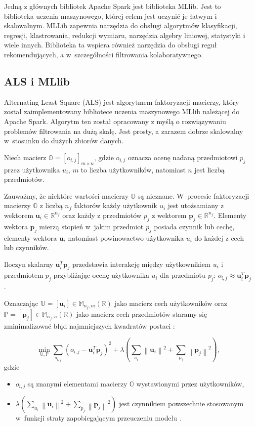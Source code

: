 \documentclass[12pt,a4paper]{report}
\newcommand{\setR}{\mathbb{R}}
\newcommand{\norm}[2][]{\left\| {#2} \right\|_{#1}}
\begin{document}
Jedną z głównych bibliotek Apache Spark jest biblioteka MLlib. Jest to biblioteka uczenia maszynowego, której celem jest uczynić je łatwym i skalowalnym. MLLib zapewnia narzędzia do obsługi algorytmów klasyfikacji, regresji, klastrowania, redukcji wymiaru, narzędzia algebry liniowej, statystyki i wiele innych. Biblioteka ta wspiera również narzędzia do obsługi reguł rekomendujących, a w~szczególności filtrowania kolaboratywnego.

\subsection{ALS i MLlib}
Alternating Least Square (ALS) jest algorytmem faktoryzacji macierzy, który został zaimplementowany bibliotece uczenia maszynowego MLlib należącej do Apache Spark. Algorytm ten został opracowany z myślą o rozwiązywaniu problemów filtrowania na dużą skalę. Jest prosty, a zarazem dobrze skalowalny w~stosunku do dużych zbiorów danych.

Niech macierz $\mathbb{O}=[o_{i,j}]_{m \times n}$, gdzie $o_{i,j}$ oznacza ocenę nadaną przedmiotowi $p_j$ przez użytkownika $u_i$, $m$ to liczba użytkowników, natomiast $n$ jest liczbą przedmiotów.

Zauważmy, że niektóre wartości macierzy $\mathbb{O}$ są nieznane. W~procesie faktoryzacji macierzy $\mathbb{O}$ z liczbą $n_f$ faktorów każdy użytkownik $u_i$ jest utożsamiany z wektorem $\mathbf{u}_i \in \setR^{n_f}$ oraz każdy z przedmiotów $p_j$ z wektorem $\mathbf{p}_j \in \setR^{n_f}$. Elementy wektora $\mathbf{p}_j$ mierzą stopień w~jakim przedmiot $p_j$ posiada czynnik lub cechę, elementy wektora $\mathbf{u}_i$ natomiast powinowactwo użytkownika $u_i$ do każdej z cech lub czynników.

Iloczyn skalarny $\mathbf{u}_i^T \mathbf{p}_j$ przedstawia interakcję między użytkownikiem $u_i$ i przedmiotem $p_j$ przybliżając ocenę użytkownika $u_i$ dla przedmiotu $p_j$: $o_{i,j} \approx \mathbf{u}_i^T \mathbf{p}_j$. 

Oznaczając $\mathbb{U}=[\mathbf{u}_i] \in \mathbb{M}_{n_f,m}(\setR)$ jako macierz cech użytkowników oraz $\mathbb{P}=[\mathbf{p}_j] \in \mathbb{M}_{n_f,n}(\setR)$ jako macierz cech przedmiotów staramy się zminimalizować błąd najmniejszych kwadratów postaci {\citep{mcvals}}:

$$
\min_{\mathbb{U}, \mathbb{P}} \sum_{o_{i,j}} (o_{i,j} - \mathbf{u}_i^T \mathbf{p}_j)^2 + \lambda (\sum_{u_i} \norm{\mathbf{u}_i}^2 + \sum_{p_j} \norm{\mathbf{p}_j}^2),
$$
gdzie 
\begin{itemize}
\item $o_{i,j}$ są znanymi elementami macierzy $\mathbb{O}$ wystawionymi przez użytkowników,
\item $\lambda (\sum_{u_i} \norm{\mathbf{u}_i}^2 + \sum_{p_j} \norm{\mathbf{p}_j}^2)$ jest czynnikiem powszechnie stosowanym w~funkcji straty zapobiegającym przeuczeniu modelu .
\end{itemize}
\end{document}
